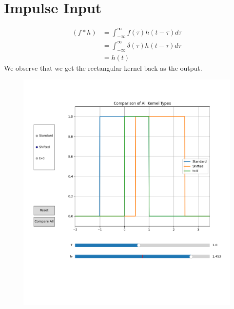 \documentclass[12pt,a4paper]{report}
\newcommand{\brak}[1]{\ensuremath{\left(#1\right)}}
\providecommand{\brak}[1]{\ensuremath{\left(#1\right)}}
\begin{document}
\section{Impulse Input}
\begin{align*}
    \brak{f\ast h} &= \int_{-\infty}^{\infty} f\brak{\tau} h\brak{t-\tau}d\tau\\
    &= \int_{-\infty}^{\infty} \delta\brak{\tau} h\brak{t-\tau}d\tau\\ 
    &= h\brak{t}
\end{align*}
We observe that we get the rectangular kernel back as the output.
\begin{figure}[h!]
    \centering
    \includegraphics[width=0.7\linewidth]{figs/imp_conv.png}
    \label{fig:enter-label}
\end{figure}
\end{document}

